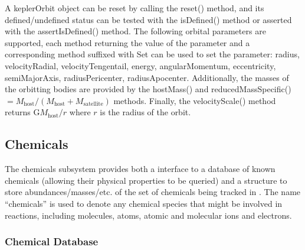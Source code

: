 A {\normalfont \ttfamily keplerOrbit} object can be reset by calling the {\normalfont \ttfamily reset()} method, and its defined/undefined status can be tested with the {\normalfont \ttfamily isDefined()} method or asserted with the {\normalfont \ttfamily assertIsDefined()} method. The following orbital parameters are supported, each method returning the value of the parameter and a corresponding method suffixed with {\normalfont \ttfamily Set} can be used to set the parameter: {\normalfont \ttfamily radius}, {\normalfont \ttfamily velocityRadial}, {\normalfont \ttfamily velocityTengentail}, {\normalfont \ttfamily energy}, {\normalfont \ttfamily angularMomentum}, {\normalfont \ttfamily eccentricity}, {\normalfont \ttfamily semiMajorAxis}, {\normalfont \ttfamily radiusPericenter}, {\normalfont \ttfamily radiusApocenter}. Additionally, the masses of the orbitting bodies are provided by the {\normalfont \ttfamily hostMass()} and {\normalfont \ttfamily reducedMassSpecific()}$=M_\mathrm{host}/(M_\mathrm{host}+M_\mathrm{satellite})$ methods. Finally, the {\normalfont \ttfamily velocityScale()} method returns $\mathrm{G}M_\mathrm{host}/r$ where $r$ is the radius of the orbit.

\subsection{Chemicals}\label{sec:ChemicalSubsystem}

The chemicals subsystem provides both a interface to a database of known chemicals (allowing their physical properties to be queried) and a structure to store abundances/masses/etc. of the set of chemicals being tracked in \glc. The name ``chemicals'' is used to denote any chemical species that might be involved in reactions, including molecules, atoms, atomic and molecular ions and electrons.

\subsubsection{Chemical Database}

